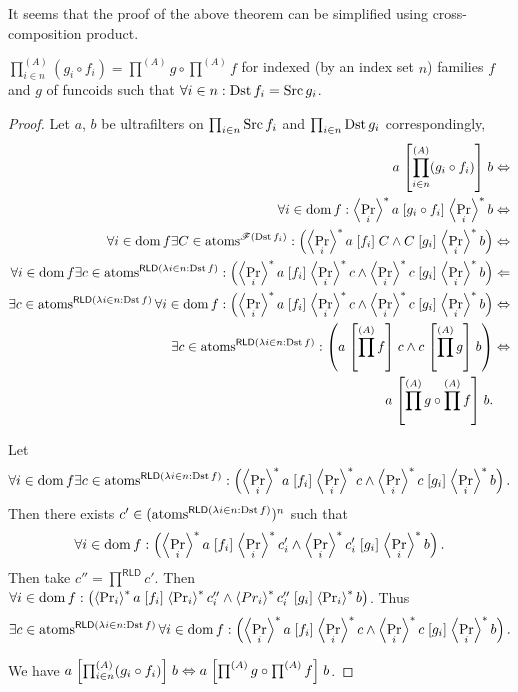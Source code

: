 \begin{rem}
It seems that the proof of the above theorem can be simplified using
cross-composition product.\end{rem}
\begin{thm}
$\prod_{i\in n}^{(A)}(g_{i}\circ f_{i})=\prod^{(A)}g\circ\prod^{(A)}f$
for indexed (by an index set $n$) families $f$ and $g$ of funcoids
such that $\forall i\in n:\Dst f_{i}=\Src g_{i}$.\end{thm}
\begin{proof}
Let $a$, $b$ be ultrafilters on $\prod_{i\in n}\Src f_{i}$ and
$\prod_{i\in n}\Dst g_{i}$ correspondingly,
\begin{align*}
a\suprel{\prod_{i\in n}^{(A)}(g_{i}\circ f_{i})}b & \Leftrightarrow\\
\forall i\in\dom f:\rsupfun{\Pr_{i}}a\suprel{g_{i}\circ f_{i}}\rsupfun{\Pr_{i}}b & \Leftrightarrow\\
\forall i\in\dom f\exists C\in\atoms^{\mathscr{F}(\Dst f_{i})}:\left(\rsupfun{\Pr_{i}}a\suprel{f_{i}}C\land C\suprel{g_{i}}\rsupfun{\Pr_{i}}b\right) & \Leftrightarrow\\
\forall i\in\dom f\exists c\in\atoms^{\mathsf{RLD}(\mylamdba in{\Dst f})}:\left(\rsupfun{\Pr_{i}}a\suprel{f_{i}}\rsupfun{\Pr_{i}}c\land\rsupfun{\Pr_{i}}c\suprel{g_{i}}\rsupfun{\Pr_{i}}b\right) & \Leftarrow\\
\exists c\in\atoms^{\mathsf{RLD}(\mylamdba in{\Dst f})}\forall i\in\dom f:\left(\rsupfun{\Pr_{i}}a\suprel{f_{i}}\rsupfun{\Pr_{i}}c\land\rsupfun{\Pr_{i}}c\suprel{g_{i}}\rsupfun{\Pr_{i}}b\right) & \Leftrightarrow\\
\exists c\in\atoms^{\mathsf{RLD}(\mylamdba in{\Dst f})}:\left(a\suprel{\prod^{(A)}f}c\land c\suprel{\prod^{(A)}g}b\right) & \Leftrightarrow\\
a\suprel{\prod^{(A)}g\circ\prod^{(A)}f}b.
\end{align*}


Let 
\[
\forall i\in\dom f\exists c\in\atoms^{\mathsf{RLD}(\mylamdba in{\Dst f})}:\left(\rsupfun{\Pr_{i}}a\suprel{f_{i}}\rsupfun{\Pr_{i}}c\land\rsupfun{\Pr_{i}}c\suprel{g_{i}}\rsupfun{\Pr_{i}}b\right).
\]
Then there exists $c'\in(\atoms^{\mathsf{RLD}(\lambda i\in n:\Dst f)})^{n}$
such that
\[
\forall i\in\dom f:\left(\rsupfun{\Pr_{i}}a\suprel{f_{i}}\rsupfun{\Pr_{i}}c'_{i}\land\rsupfun{\Pr_{i}}c'_{i}\suprel{g_{i}}\rsupfun{\Pr_{i}}b\right).
\]
Then take $c''=\prod^{\mathsf{RLD}}c'$. Then $\forall i\in\dom f:\left(\rsupfun{\Pr_{i}}a\suprel{f_{i}}\rsupfun{\Pr_{i}}c''_{i}\wedge\rsupfun{Pr_{i}}c''_{i}\suprel{g_{i}}\rsupfun{\Pr_{i}}b\right)$.
Thus 
\[
\exists c\in\atoms^{\mathsf{RLD}(\lambda i\in n:\Dst f)}\forall i\in\dom f:\left(\rsupfun{\Pr_{i}}a\suprel{f_{i}}\rsupfun{\Pr_{i}}c\wedge\rsupfun{\Pr_{i}}c\suprel{g_{i}}\rsupfun{\Pr_{i}}b\right).
\]


We have $a\suprel{\prod_{i\in n}^{(A)}(g_{i}\circ f_{i})}b\Leftrightarrow a\suprel{\prod^{(A)}g\circ\prod^{(A)}f}b$.\end{proof}
